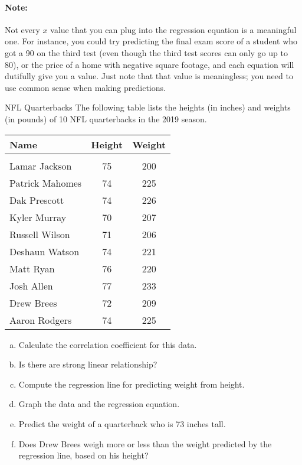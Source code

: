 \paragraph{Note:} Not every $x$ value that you can plug into the regression equation is a meaningful one.  For instance, you could try predicting the final exam score of a student who got a 90 on the third test (even though the third test scores can only go up to 80), or the price of a home with negative square footage, and each equation will dutifully give you a value.  Just note that that value is meaningless; you need to use common sense when making predictions.

\begin{example}{NFL Quarterbacks}
The following table lists the heights (in inches) and weights (in pounds) of 10 NFL quarterbacks in the 2019 season.
\begin{center}
\begin{tabular}{l c c}
\textbf{Name} & \textbf{Height} & \textbf{Weight}\\
\hline
& & \\
Lamar Jackson & 75 & 200\\
Patrick Mahomes & 74 & 225\\
Dak Prescott & 74 & 226\\
Kyler Murray & 70 & 207\\
Russell Wilson & 71 & 206\\
Deshaun Watson & 74 & 221\\
Matt Ryan & 76 & 220\\
Josh Allen & 77 & 233\\
Drew Brees & 72 & 209\\
Aaron Rodgers & 74 & 225\\
\end{tabular}
\end{center}
\begin{enumerate}[(a)]
\item Calculate the correlation coefficient for this data.
\item Is there are strong linear relationship?
\item Compute the regression line for predicting weight from height.
\item Graph the data and the regression equation.
\item Predict the weight of a quarterback who is 73 inches tall.
\item Does Drew Brees weigh more or less than the weight predicted by the regression line, based on his height?
\end{enumerate}


\end{example}

